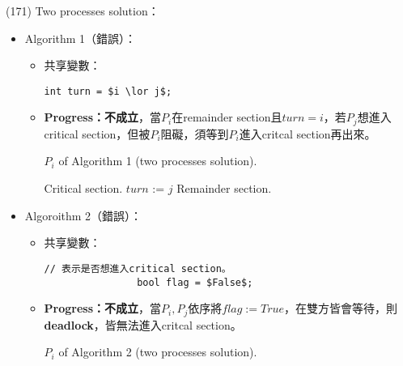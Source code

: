 \begin{theorem}{(171)} Two processes solution：\begin{itemize}
        \item Algorithm 1（錯誤）：\begin{itemize}
            \item 共享變數：\begin{lstlisting}[caption={Shared variables of Algorithm 1 (two processes solution).}, captionpos=b, mathescape=true]
                int turn = $i \lor j$;
            \end{lstlisting}
            \item \textbf{Progress：不成立}，當$P_i$在remainder section且$turn = i$，若$P_j$想進入critical section，但被$P_i$阻礙，須等到$P_i$進入critcal section再出來。
            \begin{algorithm}[H]
                \caption{$P_i$ of Algorithm 1 (two processes solution).}
                \begin{algorithmic}[1]
                        \Repeat 
                            \EndWhile
                            \State Critical section.
                            \State $turn$ := $j$
                            \State Remainder section.
                    \EndFunction
                \end{algorithmic}
            \end{algorithm}  
        \end{itemize}
        \item Algoroithm 2（錯誤）：\begin{itemize}
            \item 共享變數：\begin{lstlisting}[caption={Shared variables of Algorithm 2 (two processes solution).}, captionpos=b, mathescape=true]
                // 表示是否想進入critical section。
                bool flag = $False$;
            \end{lstlisting}
            \item \textbf{Progress：不成立}，當$P_i, P_j$依序將$flag := True$，在雙方皆會等待，則\textbf{deadlock}，皆無法進入critcal section。
            \begin{algorithm}[H]
                \caption{$P_i$ of Algorithm 2 (two processes solution).}
                \begin{algorithmic}[1]

\end{algorithmic}
\end{algorithm}
\end{itemize}
\end{itemize}
\end{theorem}
